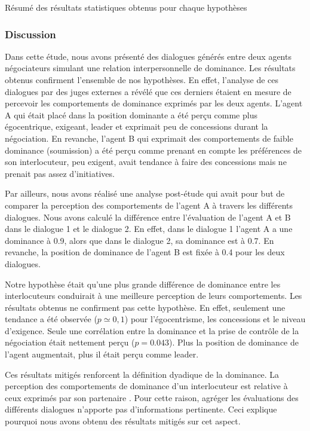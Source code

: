 {\begin{table}[p]
\begin{adjustbox}{angle=90}
					\caption{Résumé des résultats statistiques obtenus pour chaque hypothèses}
					\label{tab:resetude1}
				\end{adjustbox}
			\end{table}
				
			\subsubsection{Discussion}	
				Dans cette étude, nous avons présenté des dialogues générés entre deux agents négociateurs simulant une relation interpersonnelle de dominance. 
				Les résultats obtenus confirment l'ensemble de nos hypothèses. En effet, l'analyse de ces dialogues par des juges externes a révélé que ces derniers étaient en mesure de percevoir les comportements de dominance exprimés par les deux agents. L'agent A qui était placé dans la position dominante a été perçu comme plus égocentrique, exigeant, leader et exprimait peu de concessions durant la négociation. En revanche, l'agent B qui exprimait des comportements de faible dominance (soumission) a été perçu comme prenant en compte les préférences de son interlocuteur, peu exigent, avait tendance à faire des concessions mais ne prenait pas assez d'initiatives.  
				
				Par ailleurs, nous avons réalisé une analyse post-étude qui avait pour but de comparer la perception des comportements de l'agent A à travers les différents dialogues. 
				Nous avons calculé la différence entre l'évaluation de l'agent A et B dans le dialogue 1 et le dialogue 2. En effet, dans le dialogue 1 l'agent A a une dominance à 0.9, alors que dans le dialogue 2, sa dominance est à 0.7. En revanche, la position de dominance de l'agent B est fixée à 0.4 pour les deux dialogues. 
				
				Notre hypothèse était qu'une plus grande différence de dominance entre les interlocuteurs conduirait à une meilleure perception de leurs comportements. Les résultats obtenus ne confirment pas cette hypothèse. En effet, seulement une tendance a été observée ($ p \simeq 0,1 $) pour l'égocentrisme, les concessions et le niveau d'exigence. Seule une corrélation entre la dominance et la prise de contrôle de la négociation était nettement perçu ($p = 0.043$). Plus la position de dominance de l'agent augmentait, plus il était perçu comme leader. 
				
				Ces résultats mitigés renforcent la définition dyadique de la dominance. La perception des comportements de dominance d'un interlocuteur est relative à ceux exprimés par son partenaire \cite{dunbar2005perceptions}. 
				Pour cette raison, agréger les évaluations des différents dialogues n'apporte pas d'informations pertinente. Ceci explique pourquoi nous avons obtenu des résultats mitigés sur cet aspect.
				
}
